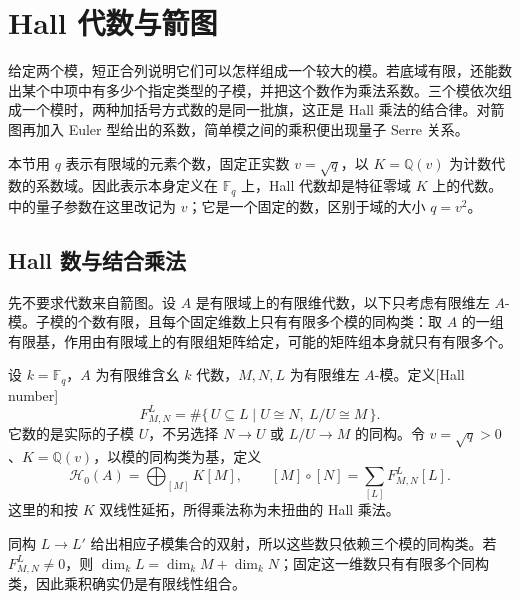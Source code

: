 
\section{Hall 代数与箭图}
\label{b5:sec:B06}

给定两个模，短正合列说明它们可以怎样组成一个较大的模。若底域有限，还能数出某个中项中有多少个指定类型的子模，并把这个数作为乘法系数。三个模依次组成一个模时，两种加括号方式数的是同一批旗，这正是 Hall 乘法的结合律。对箭图再加入 Euler 型给出的系数，简单模之间的乘积便出现量子 Serre 关系。

\ProseParagraphBreak
本节用 \(q\) 表示有限域的元素个数，固定正实数 \(v=\sqrt q\)，以 \(K=\mathbb Q(v)\) 为计数代数的系数域。因此表示本身定义在 \(\mathbb F_q\) 上，Hall 代数却是特征零域 \(K\) 上的代数。中的量子参数在这里改记为 \(v\)；它是一个固定的数，区别于域的大小 \(q=v^2\)。

\subsection{Hall 数与结合乘法}
\label{b5:subsec:B06:01}

先不要求代数来自箭图。设 \(A\) 是有限域上的有限维代数，以下只考虑有限维左 \(A\)-模。子模的个数有限，且每个固定维数上只有有限多个模的同构类：取 \(A\) 的一组有限基，作用由有限域上的有限组矩阵给定，可能的矩阵组本身就只有有限多个。

\begin{definition}\label{b5:def:B-hall-number}
	设 \(k=\mathbb F_q\)，\(A\) 为有限维含幺 \(k\) 代数，\(M,N,L\) 为有限维左 \(A\)-模。定义[Hall number]
	\[
		F_{M,N}^{L}
		=\#\{\,U\subseteq L\mid U\cong N,\ L/U\cong M\,\}.
	\]
	它数的是实际的子模 \(U\)，不另选择 \(N\to U\) 或 \(L/U\to M\) 的同构。令 \(v=\sqrt q>0\)、\(K=\mathbb Q(v)\)，以模的同构类为基，定义
	\[
		\mathcal H_0(A)=\bigoplus_{[M]}K[M],\qquad
		[M]\circ[N]=\sum_{[L]}F_{M,N}^{L}[L].
	\]
	这里的和按 \(K\) 双线性延拓，所得乘法称为未扭曲的 Hall 乘法。
\end{definition}
同构 \(L\to L'\) 给出相应子模集合的双射，所以这些数只依赖三个模的同构类。若 \(F_{M,N}^{L}\ne0\)，则 \(\dim_kL=\dim_kM+\dim_kN\)；固定这一维数只有有限多个同构类，因此乘积确实仍是有限线性组合。

